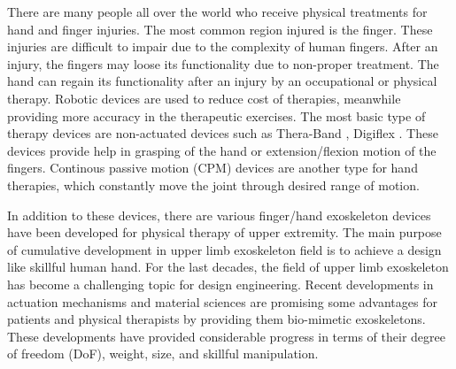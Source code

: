 \documentclass[a4paper,12pt]{article}
\begin{document}
There are many people all over the world who receive physical treatments for hand and finger injuries. The most common region injured is the finger\cite{daan}. These injuries are difficult to impair due to the complexity of human fingers. After an injury, the fingers may loose its functionality due to non-proper treatment. The hand can regain its functionality after an injury by an occupational or physical therapy. Robotic devices are used to reduce cost of therapies, meanwhile providing more accuracy in the therapeutic exercises. The most basic type of therapy devices are non-actuated devices such as Thera-Band \cite{thera}, Digiflex \cite{digiflex}. These devices provide help in grasping of the hand or extension/flexion motion of the fingers. Continous passive motion (CPM) devices are another type for hand therapies, which constantly move the joint through desired range of motion\cite{SCHWARTZ2006448}.

In addition to these devices, there are various finger/hand exoskeleton devices have been developed for physical therapy of upper extremity\cite{kawasakihapt}\cite{lucas}\cite{frisoli}. The main purpose of cumulative development in upper limb exoskeleton field is to achieve a design like skillful human hand. For the last decades, the field of upper limb exoskeleton has become a challenging topic for design engineering. Recent developments in actuation mechanisms and material sciences are promising some advantages for patients and physical therapists by providing them bio-mimetic exoskeletons. These developments have provided considerable progress in terms of their degree of freedom (DoF), weight, size, and skillful manipulation\cite{Heo2012}.
\end{document}
